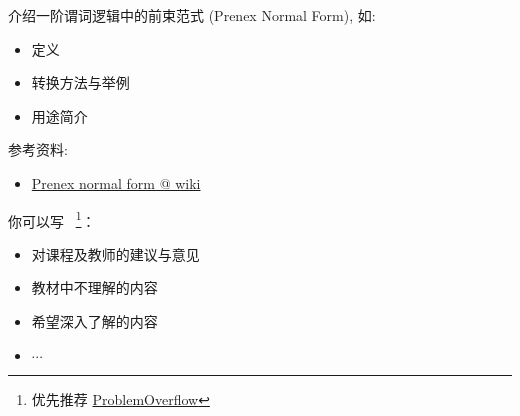 \documentclass[a4paper, justified]{tufte-handout}
\begin{document}
\begin{solution}
\end{solution}

\begin{ot}[前束范式]
  介绍一阶谓词逻辑中的前束范式 (Prenex Normal Form), 如:
  \begin{itemize}
    \item 定义
    \item 转换方法与举例
    \item 用途简介
  \end{itemize}

  参考资料:
  \begin{itemize}
    \item \href{https://en.wikipedia.org/wiki/Prenex\_normal\_form}{Prenex normal form @ wiki}
  \end{itemize}
\end{ot}

\begin{solution}
\end{solution}

\begincorrection

\beginfb

你可以写
~\footnote{优先推荐 \href{problemoverflow.top}{ProblemOverflow}}：
\begin{itemize}
  \item 对课程及教师的建议与意见
  \item 教材中不理解的内容
  \item 希望深入了解的内容
  \item $\cdots$
\end{itemize}
\end{document}
